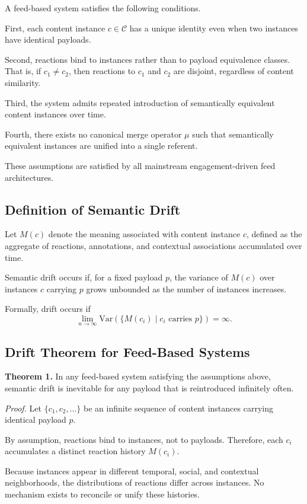 \documentclass[11pt,oneside]{article}
\begin{document}
A feed-based system satisfies the following conditions.

First, each content instance $c \in \mathcal{C}$ has a unique identity even when two instances have identical payloads.

Second, reactions bind to instances rather than to payload equivalence classes. That is, if $c_1 \neq c_2$, then reactions to $c_1$ and $c_2$ are disjoint, regardless of content similarity.

Third, the system admits repeated introduction of semantically equivalent content instances over time.

Fourth, there exists no canonical merge operator $\mu$ such that semantically equivalent instances are unified into a single referent.

These assumptions are satisfied by all mainstream engagement-driven feed architectures.

\subsection{Definition of Semantic Drift}

Let $M(c)$ denote the meaning associated with content instance $c$, defined as the aggregate of reactions, annotations, and contextual associations accumulated over time.

Semantic drift occurs if, for a fixed payload $p$, the variance of $M(c)$ over instances $c$ carrying $p$ grows unbounded as the number of instances increases.

Formally, drift occurs if
\[
\lim_{n \to \infty} \mathrm{Var}\left( \{ M(c_i) \mid c_i \text{ carries } p \} \right) = \infty.
\]

\subsection{Drift Theorem for Feed-Based Systems}

\textbf{Theorem 1.}  
In any feed-based system satisfying the assumptions above, semantic drift is inevitable for any payload that is reintroduced infinitely often.

\emph{Proof.}  
Let $\{c_1, c_2, \dots\}$ be an infinite sequence of content instances carrying identical payload $p$.

By assumption, reactions bind to instances, not to payloads. Therefore, each $c_i$ accumulates a distinct reaction history $M(c_i)$.

Because instances appear in different temporal, social, and contextual neighborhoods, the distributions of reactions differ across instances. No mechanism exists to reconcile or unify these histories.
\end{document}
